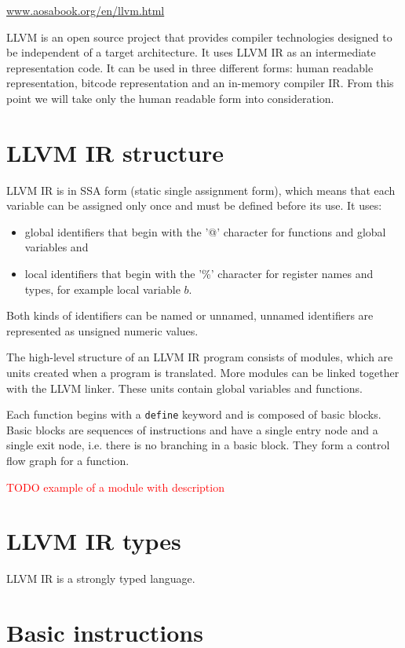 \url{www.aosabook.org/en/llvm.html}
\medskip

LLVM is an open source project that provides compiler technologies designed to
be independent of a target architecture. It uses LLVM IR as an intermediate
representation code. It can be used in three different forms: human readable
representation, bitcode representation and an in-memory compiler IR. From this
point we will take only the human readable form into consideration.

\section{LLVM IR structure} %

LLVM IR is in SSA form (static single assignment form), which means that each
variable can be assigned only once and must be defined before its use. It uses:

\begin{itemize}
    \item global identifiers that begin with the '@' character for functions
and global variables and
    \item local identifiers that begin with the '\%' character for register
names and types, for example local variable $b$.
\end{itemize}

Both kinds of identifiers can be named or unnamed, unnamed identifiers are
represented as unsigned numeric values. 

The high-level structure of an LLVM IR program consists of modules, which are
units created when a program is translated. More modules can be linked together
with the LLVM linker. These units contain global variables and functions.

Each function begins with a \texttt{define} keyword and is composed of basic
blocks. Basic blocks are sequences of instructions and have a single entry node
and a single exit node, i.e. there is no branching in a basic block. They form
a control flow graph for a function. 

\textcolor{red}{TODO example of a module with description}

\section{LLVM IR types}

LLVM IR is a strongly typed language.

\section{Basic instructions}


